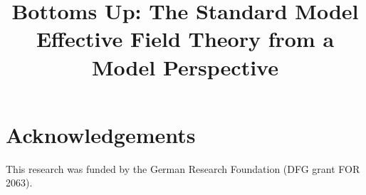 \documentclass[letterpaper]{article}
\title{Bottoms Up: The Standard Model Effective Field Theory from a Model Perspective}
\author{%
}
\date{}
\begin{document}
\maketitle
















\section{Acknowledgements}
This research was funded by the German Research Foundation (DFG grant FOR 2063). 



\end{document}
